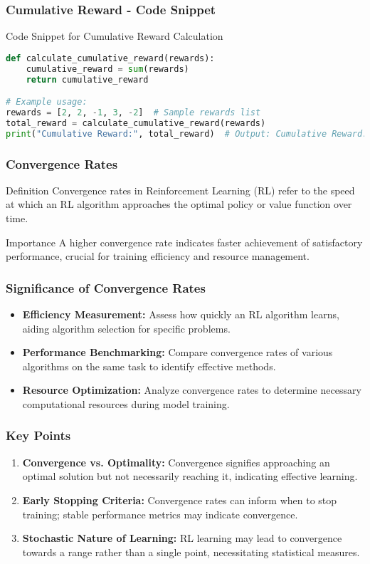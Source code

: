 \documentclass{beamer}
\begin{document}
\begin{frame}[fragile]
    \frametitle{Cumulative Reward - Code Snippet}
    \begin{block}{Code Snippet for Cumulative Reward Calculation}
        \begin{lstlisting}[language=Python]
def calculate_cumulative_reward(rewards):
    cumulative_reward = sum(rewards)
    return cumulative_reward

# Example usage:
rewards = [2, 2, -1, 3, -2]  # Sample rewards list
total_reward = calculate_cumulative_reward(rewards)
print("Cumulative Reward:", total_reward)  # Output: Cumulative Reward: 4
        \end{lstlisting}
    \end{block}
\end{frame}

\begin{frame}
    \frametitle{Convergence Rates}
    \begin{block}{Definition}
        Convergence rates in Reinforcement Learning (RL) refer to the speed at which an RL algorithm approaches the optimal policy or value function over time.
    \end{block}
    \begin{block}{Importance}
        A higher convergence rate indicates faster achievement of satisfactory performance, crucial for training efficiency and resource management.
    \end{block}
\end{frame}

\begin{frame}
    \frametitle{Significance of Convergence Rates}
    \begin{itemize}
        \item \textbf{Efficiency Measurement:} Assess how quickly an RL algorithm learns, aiding algorithm selection for specific problems.
        \item \textbf{Performance Benchmarking:} Compare convergence rates of various algorithms on the same task to identify effective methods.
        \item \textbf{Resource Optimization:} Analyze convergence rates to determine necessary computational resources during model training.
    \end{itemize}
\end{frame}

\begin{frame}
    \frametitle{Key Points}
    \begin{enumerate}
        \item \textbf{Convergence vs. Optimality:} Convergence signifies approaching an optimal solution but not necessarily reaching it, indicating effective learning.
        \item \textbf{Early Stopping Criteria:} Convergence rates can inform when to stop training; stable performance metrics may indicate convergence.
        \item \textbf{Stochastic Nature of Learning:} RL learning may lead to convergence towards a range rather than a single point, necessitating statistical measures.
    \end{enumerate}
\end{frame}
\end{document}
